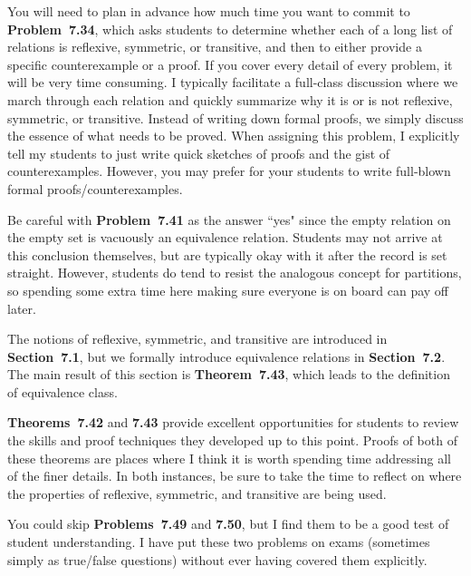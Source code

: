 \documentclass[11pt]{article}%
\newcommand{\blankline}{\pagebreak[2]\vspace{.5\baselineskip}}
\begin{document}
\blankline

You will need to plan in advance how much time you want to commit to \textbf{Problem~7.34}, which asks students to determine whether each of a long list of relations is reflexive, symmetric, or transitive, and then to either provide a specific counterexample or a proof.  If you cover every detail of every problem, it will be very time consuming.  I typically facilitate a full-class discussion where we march through each relation and quickly summarize why it is or is not reflexive, symmetric, or transitive.  Instead of writing down formal proofs, we simply discuss the essence of what needs to be proved.  When assigning this problem, I explicitly tell my students to just write quick sketches of proofs and the gist of counterexamples.  However, you may prefer for your students to write full-blown formal proofs/counterexamples. 

\blankline

Be careful with \textbf{Problem~7.41} as the answer ``yes" since the empty relation on the empty set is vacuously an equivalence relation.  Students may not arrive at this conclusion themselves, but are typically okay with it after the record is set straight.  However, students do tend to resist the analogous concept for partitions, so spending some extra time here making sure everyone is on board can pay off later. 

 

The notions of reflexive, symmetric, and transitive are introduced in \textbf{Section~7.1}, but we formally introduce equivalence relations in \textbf{Section~7.2}. The main result of this section is \textbf{Theorem~7.43}, which leads to the definition of equivalence class.  

\blankline

\textbf{Theorems~7.42} and \textbf{7.43} provide excellent opportunities for students to review the skills and proof techniques they developed up to this point.  Proofs of both of these theorems are places where I think it is worth spending time addressing all of the finer details.  In both instances, be sure to take the time to reflect on where the properties of reflexive, symmetric, and transitive are being used.

\blankline

You could skip \textbf{Problems~7.49} and \textbf{7.50}, but I find them to be a good test of student understanding.  I have put these two problems on exams (sometimes simply as true/false questions) without ever having covered them explicitly.
\end{document}

